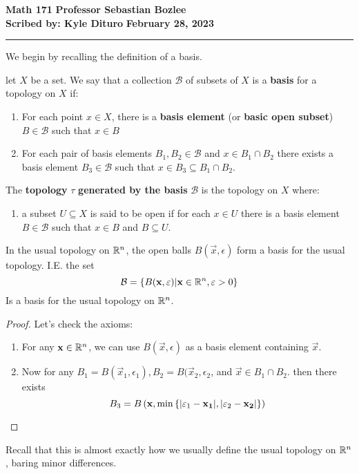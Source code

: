 \documentclass[12pt, twosided]{article}
\begin{document}
\noindent \textbf{Math 171} \hfill \textbf{Professor Sebastian Bozlee} \\
\textbf{Scribed by: Kyle Dituro} \hfill \textbf{February 28, 2023}\hrule
\vspace{.2in}

We begin by recalling the definition of a basis.

\begin{df}
  let \(X\) be a set. We say that a collection \(\mathcal{B}\) of subsets of \(X\) is a \textbf{basis} for a topology on \(X\) if:
  \begin{enumerate}
  \item For each point \(x\in X\), there is a \textbf{basis element} (or \textbf{basic open subset}) \(B \in \mathcal{B}\) such that \(x \in B\)
  \item For each pair of basis elements \(B_1, B_2 \in \mathcal{B}\) and \(x \in B_1 \cap B_2\) there exists a basis element \(B_3 \in \mathcal{B}\) such that \(x \in B_3 \subseteq B_1 \cap B_2\).
  \end{enumerate}

  The \textbf{topology} \(\tau\) \textbf{generated by the basis} \(\mathcal{B}\) is the topology on \(X\) where:
  \begin{enumerate}
  \item a subset \(U \subseteq X\) is said to be open if for each \(x \in U\) there is a basis element \(B \in \mathcal{B}\) such that \(x \in B\) and \(B \subseteq U\).
  \end{enumerate}
\end{df}

\begin{exa}
  In the usual topology on \(\mathbb{R}^n\), the open balls \(B(\vec{x}, \epsilon)\) form a basis for the usual topology. I.E. the set
  \[\mathcal{B} = \left\{ B(\mathbf{x}, \varepsilon) \middle\vert \mathbf{x} \in \mathbb{R}^n, \varepsilon > 0 \right\}\] Is a basis for the usual topology on \(\mathbb{R}^n\).

  \begin{proof}
    Let's check the axioms:

    \begin{enumerate}
    \item For any \(\mathbf{x} \in \mathbb{R}^n\), we can use \(B(\vec{x}, \epsilon)\) as a basis element containing \(\vec{x}\).
    \item Now for any \(B_1 = B(\vec{x}_1, \epsilon_1), B_2 = B(\vec{x}_2, \epsilon_2\), and \(\vec{x} \in B_1 \cap B_2\). then there exists \[B_3 = B\left(\mathbf{x}, \min \left\{ |\varepsilon_1 - \mathbf{x_1}|, |\varepsilon_2 - \mathbf{x_2}| \right\}\right)\]
    \end{enumerate}
  \end{proof}

  Recall that this is almost exactly how we usually define the usual topology on \(\mathbb{R}^n\), baring minor differences.
\end{exa}
\end{document}
